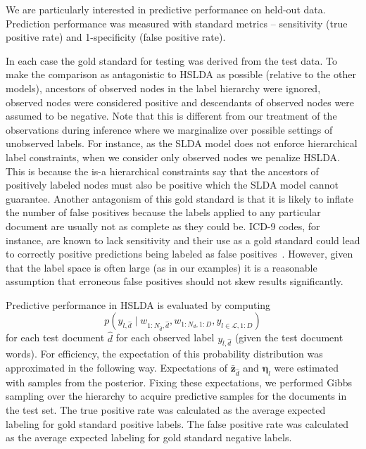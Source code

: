 We are particularly interested in
predictive performance on held-out data. Prediction performance was measured
with standard metrics -- sensitivity (true positive rate) and 1-specificity
(false positive rate). 

In each case the gold standard for testing was derived from the test data. To make the comparison as antagonistic to HSLDA as possible (relative to the other models), ancestors of
observed nodes in the label hierarchy were ignored, observed nodes were
considered positive and descendants of observed nodes were assumed to be
negative. Note that this is different from our treatment of the observations during inference where we marginalize over possible settings of unobserved labels.
For instance, as the SLDA model does not enforce hierarchical
label constraints, when we consider only observed nodes we penalize HSLDA.  This is because
 the is-a hierarchical constraints say that the ancestors of positively labeled nodes must also be positive which the SLDA model cannot guarantee.
Another antagonism of this gold standard is that it is likely to inflate the number of false positives because
the labels applied to any particular document are usually not as complete as
they could be.  ICD-9 codes, for instance, are known to lack sensitivity and their use as a
gold standard could lead to correctly positive predictions being labeled as
false positives~\cite{Birmetal2005}.
However, given that the label space is often large (as in our examples) it is a
reasonable assumption that erroneous false positives should not skew results
significantly. 

Predictive performance in HSLDA is evaluated by computing
 \[p\left(y_{l,\hat{d}}\mid w_{1:N_{\hat{d}},\hat{d}}, w_{1:N_d,1:D},  y_{l\in\mathcal{L},1:D}\right)\] 
for each test document $\hat{d}$ for each observed label $y_{l,\hat{d}}$ (given the test document words). For efficiency, the expectation of this
probability distribution was approximated in the following way. Expectations 
of $\mathbf{\bar{z}}_{\hat{d}}$ and $\boldsymbol{\eta}_l$ were estimated with samples
from the posterior. Fixing these expectations, we performed Gibbs sampling over
the hierarchy to acquire predictive samples for the documents in the test set.
The true positive rate was calculated as the average expected labeling for
gold standard positive labels. The false positive rate was calculated 
as the average expected labeling for gold standard negative labels.

